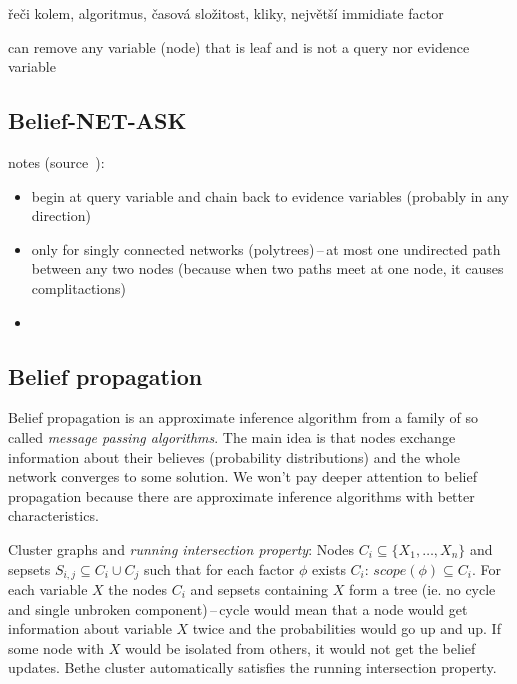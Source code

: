 \documentclass[english,cover]{fitthesis} %
\newcommand{\term}[1]{\emph{#1}}           %
\newcommand{\todo}[1]{{\color{red} #1}}
\newcommand{\note}[1]{{\color{green} #1}}
\begin{document}
\todo{řeči kolem, algoritmus, časová složitost, kliky, největší immidiate factor}

\todo{can remove any variable (node) that is leaf and is not a query nor evidence variable~\cite{russel_norvig_2ed,509,537pdf}}

\subsection{Belief-NET-ASK}
notes (source~\cite{russel_norvig_2ed}):
\begin{itemize}
	\item begin at query variable and chain back to evidence variables (probably in any direction)
	\item only for singly connected networks (polytrees)\,--\,at most one undirected path between any two nodes (because when two paths meet at one node, it causes complitactions)
	\item 
\end{itemize}



\subsection{Belief propagation}
Belief propagation is an approximate inference algorithm from a family of so called \term{message passing algorithms}. The main idea is that nodes exchange information about their believes (probability distributions) and the whole network converges to some solution. We won't pay deeper attention to belief propagation because there are approximate inference algorithms with better characteristics.

\note{Cluster graphs and \term{running intersection property}: Nodes $C_i \subseteq \lbrace X_1, \dots, X_n \rbrace$ and sepsets $S_{i,j} \subseteq C_i \cup C_j$ such that for each factor $\phi$ exists $C_i$: $scope(\phi) \subseteq C_i$.
For each variable $X$ the nodes $C_i$ and sepsets containing $X$ form a tree (ie. no cycle and single unbroken component)\,--\,cycle would mean that a node would get information about variable $X$ twice and the probabilities would go up and up. If some node with $X$ would be isolated from others, it would not get the belief updates. Bethe cluster automatically satisfies the running intersection property.}
\end{document}
